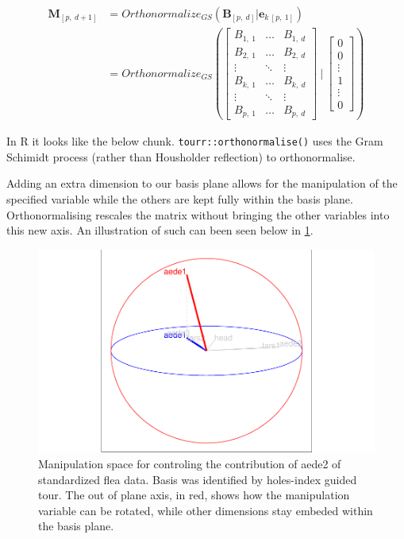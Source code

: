 \documentclass{monashthesis}
\begin{document}
\begin{align*}
  \textbf{M}_{[p,~d+1]}
  &= Orthonormalize_{GS}( \textbf{B}_{[p,~d]}|\textbf{e}_{k~[p,~1]} ) \\
  &= Orthonormalize_{GS}
  \left(
    \begin{bmatrix}
      B_{1,~1} & \dots  & B_{1,~d} \\
      B_{2,~1} & \dots  & B_{2,~d} \\
      \vdots   & \ddots & \vdots   \\
      B_{k,~1} & \dots  & B_{k,~d} \\
      \vdots   & \ddots & \vdots   \\
      B_{p,~1} & \dots  & B_{p,~d}
    \end{bmatrix}
  ~|~
    \begin{bmatrix}
      0 \\
      0 \\
      \vdots \\
      1 \\
      \vdots \\
      0
    \end{bmatrix}
  \right)
\end{align*}

In R it looks like the below chunk. \texttt{tourr::orthonormalise()} uses the Gram Schimidt process (rather than Housholder reflection) to orthonormalise.

Adding an extra dimension to our basis plane allows for the manipulation of the specified variable while the others are kept fully within the basis plane. Orthonormalising rescales the matrix without bringing the other variables into this new axis. An illustration of such can been seen below in \ref{fig:step2}.

\begin{figure}
\centering
\includegraphics{thesis_files/figure-latex/step2-1.pdf}
\caption{\label{fig:step2}Manipulation space for controling the contribution of aede2 of standardized flea data. Basis was identified by holes-index guided tour. The out of plane axis, in red, shows how the manipulation variable can be rotated, while other dimensions stay embeded within the basis plane.}
\end{figure}
\end{document}
